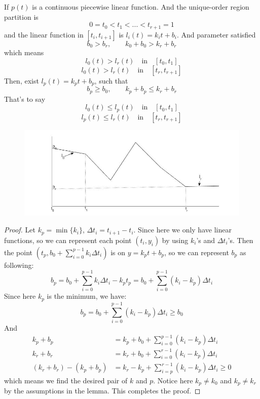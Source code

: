\begin{lemma}\label{lem:1dlattice}
	If $p(t)$ is a continuous piecewise linear function. And the unique-order region partition is
	$$0 = t_0 < t_1 < ... < t_{r+1} = 1$$
	and the linear function in $[t_i,t_{i+1}]$ is $l_i(t) = k_i t+b_i$. And parameter satisfied 
	$$ b_0 > b_r,\qquad k_0 + b_0 > k_r + b_r $$
	which means
	$$l_0(t)> l_r(t)\quad \mbox{in}\quad [t_0,t_1]$$
	$$l_0(t)> l_r(t)\quad \mbox{in}\quad [t_r,t_{r+1}]$$
	Then, exist $l_p(t) = k_p t+ b_p$, such that
	$$b_p \ge b_0,\qquad k_p+b_p\le k_r+b_r$$  
	That's to say
	$$l_0(t)\le l_p(t)\quad \mbox{in}\quad [t_0,t_1]$$
	$$l_p(t)\le l_r(t)\quad \mbox{in}\quad [t_r,t_{r+1}]$$
\end{lemma}
\begin{figure}[th]
	\centering
	\includegraphics[width=0.7\linewidth]{6DL/pic/fig1}
	\caption{}
\end{figure}

\begin{proof}
	
	Let $k_p=\min\{k_i\}$, $\Delta t_i=t_{i+1}-t_i$. 
	Since here we only have linear functions, so we can represent each point $(t_i,y_i)$ by using $k_i$'s and $\Delta t_i$'s.
	Then the point $(t_p,b_0+\sum_{i=0}^{p-1}k_i\Delta t_i)$ is on $y=k_p t+b_p$, so we can represent $b_p$ as following:
	$$b_p=b_0+\sum_{i=0}^{p-1}k_i\Delta t_i-k_p t_p=b_0+\sum_{i=0}^{p-1}(k_i-k_p)\Delta t_i$$
	Since here $k_p$ is the minimum, we have:
	$$b_p=b_0+\sum_{i=0}^{p-1}(k_i-k_p)\Delta t_i\ge b_0$$		
	And
	\begin{equation*}
	\begin{aligned}
	k_p+b_p&=k_p+b_0+\sum_{i=0}^{p-1}(k_i-k_p)\Delta t_i\\
	k_r+b_r&=k_r+b_0+\sum_{i=0}^{r-1}(k_i-k_p)\Delta t_i\\
	(k_r+b_r)-(k_p+b_p)&=k_r-k_p+\sum_{i=p}^{r-1}(k_i-k_p)\Delta t_i\ge 0
	\end{aligned}
	\end{equation*}
	which means we find the desired pair of $k$ and $p$.
	Notice here $k_p\ne k_0$ and $k_p\ne k_r$ by the assumptions in the lemma. This completes the proof.
	
\end{proof}	



